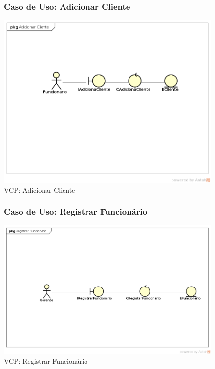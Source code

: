 \documentclass[
	12pt,				%
	openright,
	oneside,			%
	a4paper,			%
	chapter=TITLE,		%
	brazil				%
	]{abntex2}
\begin{document}
\newpage


\begin{figure}[h!]

\subsubsection*{Caso de Uso: Adicionar Cliente}

	\caption{VCP: Adicionar Cliente}
	\begin{center}
	    \includegraphics[scale=0.5]{Arquivos/Analise/V_adicionar_cliente}  
	\end{center}
\end{figure}






\begin{figure}[h!]

\subsubsection*{Caso de Uso: Registrar Funcionário}

	\caption{VCP: Registrar Funcionário}
	\begin{center}
	    \includegraphics[scale=0.5]{Arquivos/Analise/V_registrar_funcionario}  
	\end{center}
\end{figure}
\end{document}
